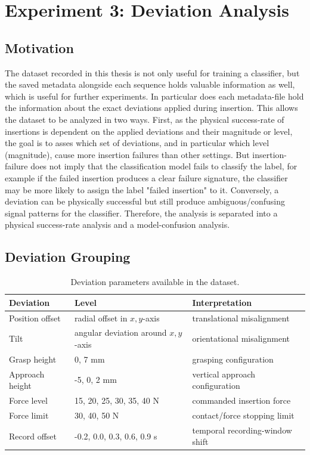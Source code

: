 \newpage
\section{Experiment 3: Deviation Analysis}
\label{sec:experiment_3}

\subsection{Motivation}
The dataset recorded in this thesis is not only useful for training a classifier, but the saved metadata alongside each sequence holds valuable information as well, which is useful for further experiments. In particular does each metadata-file hold the information about the exact deviations applied during insertion. This allows the dataset to be analyzed in two ways.
First, as the physical success-rate of insertions is dependent on the applied deviations and their magnitude or level, the goal is to asses which set of deviations, and in particular which level (magnitude), cause more insertion failures than other settings.
But insertion-failure does not imply that the classification model fails to classify the label, for example if the failed insertion produces a clear failure signature, the classifier may be more likely to assign the label "failed insertion" to it. Conversely, a deviation can be physically successful but still produce ambiguous/confusing signal patterns for the classifier. Therefore, the analysis is separated into a physical success-rate analysis and a model-confusion analysis.

\subsection{Deviation Grouping}
\begin{table}[htbp]
    \centering
    \caption{Deviation parameters available in the dataset.}
    \label{tab:deviation_parameters}
    \begin{tabular}{lll}
        \toprule
        \textbf{Deviation} & \textbf{Level} & \textbf{Interpretation} \\
        \midrule
        Position offset & radial offset in $x,y$-axis & translational misalignment \\
        Tilt & angular deviation around $x,y$-axis & orientational misalignment \\
        Grasp height & 0, 7 mm & grasping configuration \\
        Approach height & -5, 0, 2 mm & vertical approach configuration \\
        Force level & 15, 20, 25, 30, 35, 40 N & commanded insertion force \\
        Force limit & 30, 40, 50 N & contact/force stopping limit \\
        Record offset & -0.2, 0.0, 0.3, 0.6, 0.9 s & temporal recording-window shift \\
        \bottomrule
    \end{tabular}
\end{table}

